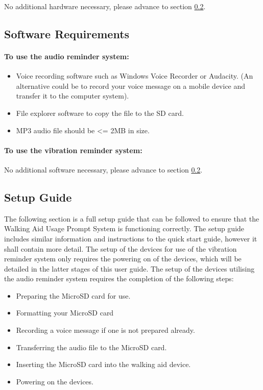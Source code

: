 			No additional hardware necessary, please advance to section \ref{subsec:setup_guide}.

		\subsection{Software Requirements}
		\label{subsec:software_reqs}

			\paragraph{To use the audio reminder system:}\mbox{}

			\begin{itemize}
				\item Voice recording software such as Windows Voice Recorder or Audacity. (An alternative could be to record your voice message on a mobile device and transfer it to the computer system).
				\item File explorer software to copy the file to the SD card.
				\item MP3 audio file should be <= 2MB in size.
			\end{itemize}

			\paragraph{To use the vibration reminder system:}\mbox{}

			No additional software necessary, please advance to section \ref{subsec:setup_guide}.

		\subsection{Setup Guide}
		\label{subsec:setup_guide}

			The following section is a full setup guide that can be followed to ensure that the Walking Aid Usage Prompt System is functioning correctly. The setup guide includes similar information and instructions to the quick start guide, however it shall contain more detail. The setup of the devices for use of the vibration reminder system only requires the powering on of the devices, which will be detailed in the latter stages of this user guide. The setup of the devices utilising the audio reminder system requires the completion of the following steps:

			\begin{itemize}
				\item Preparing the MicroSD card for use.
				\item Formatting your MicroSD card
				\item Recording a voice message if one is not prepared already.
				\item Transferring the audio file to the MicroSD card.
				\item Inserting the MicroSD card into the walking aid device.
				\item Powering on the devices.
			\end{itemize}

